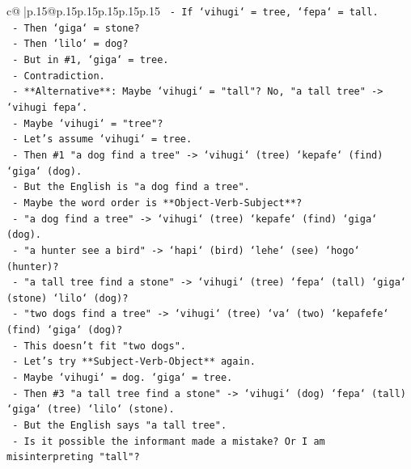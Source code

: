 \documentclass{article}
\begin{document}
{\begin{supertabular}{c@{$\;$}|p{.15\linewidth}@{}p{.15\linewidth}p{.15\linewidth}p{.15\linewidth}p{.15\linewidth}p{.15\linewidth}}
{{{\texttt{                {-}   If `vihugi` = tree, `fepa` = tall.} \\
\texttt{                {-}   Then `giga` = stone?} \\
\texttt{                {-}   Then `lilo` = dog?} \\
\texttt{                {-}   But in \#1, `giga` = tree.} \\
\texttt{                {-}   Contradiction.} \\
\texttt{                {-}   **Alternative**: Maybe `vihugi` = "tall"? No, "a tall tree" {-}> `vihugi fepa`.} \\
\texttt{                {-}   Maybe `vihugi` = "tree"?} \\
\texttt{                {-}   Let's assume `vihugi` = tree.} \\
\texttt{                {-}   Then \#1 "a dog find a tree" {-}> `vihugi` (tree) `kepafe` (find) `giga` (dog).} \\
\texttt{                {-}   But the English is "a dog find a tree".} \\
\texttt{                {-}   Maybe the word order is **Object{-}Verb{-}Subject**?} \\
\texttt{                {-}   "a dog find a tree" {-}> `vihugi` (tree) `kepafe` (find) `giga` (dog).} \\
\texttt{                {-}   "a hunter see a bird" {-}> `hapi` (bird) `lehe` (see) `hogo` (hunter)?} \\
\texttt{                {-}   "a tall tree find a stone" {-}> `vihugi` (tree) `fepa` (tall) `giga` (stone) `lilo` (dog)?} \\
\texttt{                {-}   "two dogs find a tree" {-}> `vihugi` (tree) `va` (two) `kepafefe` (find) `giga` (dog)?} \\
\texttt{                {-}   This doesn't fit "two dogs".} \\
\texttt{                {-}   Let's try **Subject{-}Verb{-}Object** again.} \\
\texttt{                {-}   Maybe `vihugi` = dog. `giga` = tree.} \\
\texttt{                {-}   Then \#3 "a tall tree find a stone" {-}> `vihugi` (dog) `fepa` (tall) `giga` (tree) `lilo` (stone).} \\
\texttt{                {-}   But the English says "a tall tree".} \\
\texttt{                {-}   Is it possible the informant made a mistake? Or I am misinterpreting "tall"?} \\
}}}
\end{supertabular}}
\end{document}
